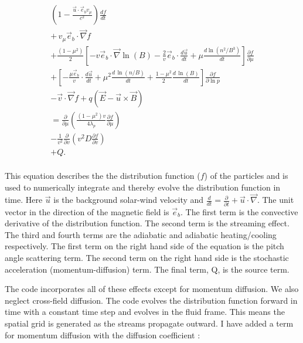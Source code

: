 \documentclass[%
 reprint,
 amsmath,amssymb,
 aps,
]{revtex4-1}
\begin{document}
\begin{equation}
  \begin{multlined}
    \\ \left( 1 - \frac{\vec{u} \cdot \vec{e}_b v_{\mu} }{c^2} \right) \frac{df}{dt}
    \\+ \, v_{\mu} \vec{e} _b \cdot \vec{\nabla} f
    \\+  \frac{(1-\mu^2)}{2} \left[ -v \vec{e} _b \cdot \vec{\nabla} \ln(B) - \frac{2}{v} \vec{e} _b \cdot \frac{d \vec{u}}{dt} + \mu \frac{d \ln ( n^2 / B^3)}{dt} \right] \frac{\partial f}{\partial \mu}
    \\+ \left[- \frac{\mu \vec{e} _b}{v} \cdot \frac{d \vec{u}}{dt} + \mu^2 \frac{d\, \ln (n/B)}{dt} + \frac{1-\mu^2}{2} \frac{d\, \ln (B)}{dt}\right] \frac{\partial f}{\partial \ln p}
    \\- \vec{v} \cdot \vec{\nabla} f + q(\vec{E} - \vec{u} \times \vec{B}) 
    \\= \frac{\partial}{\partial \mu} \left( \frac{(1-\mu^2) v}{4 \lambda_p} \frac{\partial f}{\partial \mu} \right)
    \\- \frac{1}{v^2} \frac{\partial}{\partial v} \left( v^2 D \frac{\partial f}{\partial v} \right)
    \\ +Q.
    \\
\end{multlined}
\end{equation}


This equation describes the the distribution function ($f$) of the particles and is used to numerically integrate and thereby evolve the distribution function in time. Here $\vec{u}$ is the background solar-wind velocity and $\displaystyle \frac{d}{dt} = \frac{\partial}{\partial t} + \vec{u} \cdot \vec{\nabla}$. The unit vector in the direction of the magnetic field is $\vec{e}_b$. The first term is the convective derivative of the distribution function. The second term is the streaming effect. The third and fourth terms are the adiabatic and adiabatic heating/cooling respectively. The first term on the right hand side of the equation is the pitch angle scattering term. The second term on the right hand side is the stochastic acceleration (momentum-diffusion) term. The final term, Q, is the source term.

The code incorporates all of these effects except for momentum diffusion. We also neglect cross-field diffusion. The code evolves the distribution function forward in time with a constant time step and evolves in the fluid frame. This means the spatial grid is generated as the streams propagate outward. I have added a term for momentum diffusion with the diffusion coefficient \cite{Jokipii and Lee 2010}:
\end{document}
